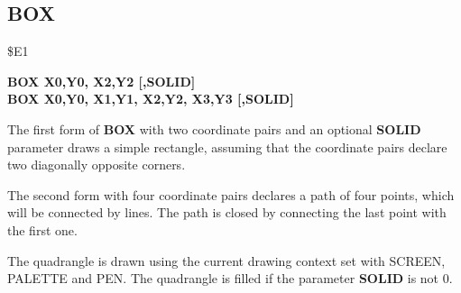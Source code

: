 \subsection{BOX}
\begin{description}[leftmargin=2cm,style=nextline]
\item [Token:] \$E1
\item [Format:] {\bf BOX X0,Y0, X2,Y2 [,SOLID]} \\
                {\bf BOX X0,Y0, X1,Y1, X2,Y2, X3,Y3 [,SOLID]}
\item [Usage:] The first form of {\bf BOX} with
               two coordinate pairs and an optional {\bf SOLID} parameter
               draws a simple rectangle, assuming that the
               coordinate pairs declare two diagonally opposite corners.

               The second form with four coordinate pairs declares a
               path of four points, which will be connected by lines.
               The path is closed by connecting the last point with the
               first one.

               The quadrangle is drawn using the current drawing context
               set with SCREEN, PALETTE and PEN.
               The quadrangle is filled if the parameter {\bf SOLID}
               is not 0.


\end{description}
